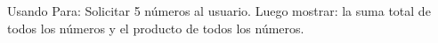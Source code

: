 ﻿
Usando Para: Solicitar 5 números al usuario. Luego mostrar: la suma total de todos los números y el producto de todos los números.


\newpage
{}

\volverindice
\newpage
